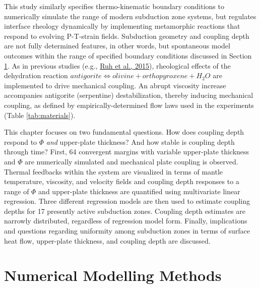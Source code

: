 This study similarly specifies thermo-kinematic boundary conditions to numerically simulate the range of modern subduction zone systems, but regulates interface rheology dynamically by implementing metamorphic reactions that respond to evolving P-T-strain fields. Subduction geometry and coupling depth are not fully determined features, in other words, but spontaneous model outcomes within the range of specified boundary conditions discussed in Section \ref{numMethods}. As in previous studies (e.g., \protect\hyperlink{ref-ruh2015}{Ruh et al., 2015}), rheological effects of the dehydration reaction \(antigorite \allowbreak \Leftrightarrow olivine + orthopyroxene + H_{2}O\) are implemented to drive mechanical coupling. An abrupt viscosity increase accompanies antigorite (serpentine) destabilization, thereby inducing mechanical coupling, as defined by empirically-determined flow laws used in the experiments (Table \ref{tab:materials}).

This chapter focuses on two fundamental questions. How does coupling depth respond to \(\Phi\) \emph{and} upper-plate thickness? And how stable is coupling depth through time? First, 64 convergent margins with variable upper-plate thickness and \(\Phi\) are numerically simulated and mechanical plate coupling is observed. Thermal feedbacks within the system are visualized in terms of mantle temperature, viscosity, and velocity fields and coupling depth responses to a range of \(\Phi\) and upper-plate thickness are quantified using multivariate linear regression. Three different regression models are then used to estimate coupling depths for 17 presently active subduction zones. Coupling depth estimates are narrowly distributed, regardless of regression model form. Finally, implications and questions regarding uniformity among subduction zones in terms of surface heat flow, upper-plate thickness, and coupling depth are discussed.

\hypertarget{numMethods}{%
\section{Numerical Modelling Methods}\label{numMethods}}

